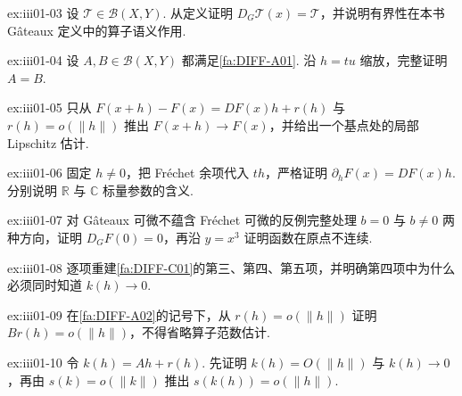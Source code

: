 \begin{FAExercise}{ex:iii01-03}
设 \(\displaystyle\mathcal T\in\mathcal B(X,Y)\). 从定义证明 \(\displaystyle D_G\mathcal T(x)=\mathcal T\)，并说明有界性在本书 Gâteaux 定义中的算子语义作用.
\end{FAExercise}

\begin{FAExercise}{ex:iii01-04}
设 \(\displaystyle A,B\in\mathcal B(X,Y)\) 都满足\autoref{fa:DIFF-A01}. 沿 \(\displaystyle h=tu\) 缩放，完整证明 \(\displaystyle A=B\).
\end{FAExercise}

\begin{FAExercise}{ex:iii01-05}
只从 \(\displaystyle F(x+h)-F(x)=DF(x)h+r(h)\) 与 \(\displaystyle r(h)=o(\|h\|)\) 推出 \(\displaystyle F(x+h)\to F(x)\)，并给出一个基点处的局部 Lipschitz 估计.
\end{FAExercise}

\begin{FAExercise}{ex:iii01-06}
固定 \(\displaystyle h\neq0\)，把 Fréchet 余项代入 \(\displaystyle th\)，严格证明 \(\displaystyle\partial_hF(x)=DF(x)h\). 分别说明 \(\displaystyle\mathbb R\) 与 \(\displaystyle\mathbb C\) 标量参数的含义.
\end{FAExercise}

\begin{FAExercise}[完整验证典型反例]{ex:iii01-07}
对 Gâteaux 可微不蕴含 Fréchet 可微的反例完整处理 \(\displaystyle b=0\) 与 \(\displaystyle b\neq0\) 两种方向，证明 \(\displaystyle D_GF(0)=0\)，再沿 \(\displaystyle y=x^3\) 证明函数在原点不连续.
\end{FAExercise}

\begin{FAExercise}{ex:iii01-08}
逐项重建\autoref{fa:DIFF-C01}的第三、第四、第五项，并明确第四项中为什么必须同时知道 \(\displaystyle k(h)\to0\).
\end{FAExercise}

\begin{FAExercise}[链式法则的第一余项]{ex:iii01-09}
在\autoref{fa:DIFF-A02}的记号下，从 \(\displaystyle r(h)=o(\|h\|)\) 证明 \(\displaystyle Br(h)=o(\|h\|)\)，不得省略算子范数估计.
\end{FAExercise}

\begin{FAExercise}[链式法则的第二余项]{ex:iii01-10}
令 \(\displaystyle k(h)=Ah+r(h)\). 先证明 \(\displaystyle k(h)=O(\|h\|)\) 与 \(\displaystyle k(h)\to0\)，再由 \(\displaystyle s(k)=o(\|k\|)\) 推出 \(\displaystyle s(k(h))=o(\|h\|)\).
\end{FAExercise}

